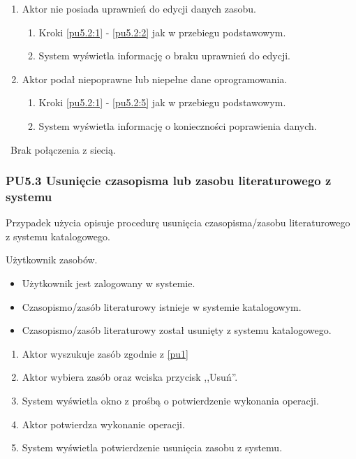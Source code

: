 \begin{enumerate}
\item Aktor nie posiada uprawnień do edycji danych zasobu.
	\begin{enumerate}[label*=\arabic*.]
		\item Kroki \ref{pu5.2:1} - \ref{pu5.2:2} jak w przebiegu podstawowym.
		\item System wyświetla informację o braku uprawnień do edycji.
	\end{enumerate}
\item Aktor podał niepoprawne lub niepełne dane oprogramowania.
	\begin{enumerate}[label*=\arabic*.]
		\item Kroki \ref{pu5.2:1} - \ref{pu5.2:5} jak w przebiegu podstawowym.
		\item System wyświetla informację o konieczności poprawienia danych.
	\end{enumerate}
\end{enumerate}

\
Brak połączenia z siecią.

\subsubsection{PU5.3 Usunięcie czasopisma lub zasobu literaturowego z systemu}

Przypadek użycia opisuje procedurę usunięcia czasopisma/zasobu literaturowego z systemu katalogowego.

Użytkownik zasobów.

\begin{itemize}
\item Użytkownik jest zalogowany w systemie.
\item Czasopismo/zasób literaturowy istnieje w systemie katalogowym.
\end{itemize}

\begin{itemize}
\item Czasopismo/zasób literaturowy został usunięty z systemu katalogowego.
\end{itemize}

\begin{enumerate}
\item \label{pu5.3:1} Aktor wyszukuje zasób zgodnie z \ref{pu1}
\item \label{pu5.3:2} Aktor wybiera zasób oraz wciska przycisk ,,Usuń''.
\item System wyświetla okno z prośbą o potwierdzenie wykonania operacji.
\item Aktor potwierdza wykonanie operacji.
\item System wyświetla potwierdzenie usunięcia zasobu z systemu.
\end{enumerate}

